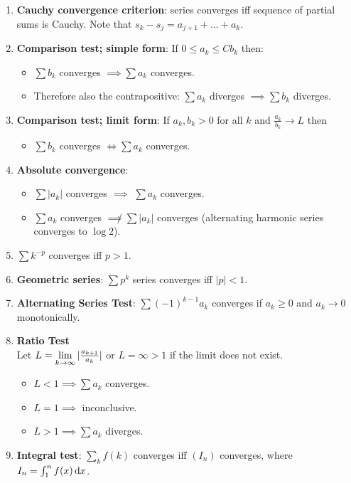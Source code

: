 \begin{theorem*}
\begin{enumerate}[label=(\roman*)]
  \item {\bf Cauchy convergence criterion}: series converges iff sequence of partial sums is
    Cauchy. Note that $s_k - s_j = a_{j+1} + \ldots + a_k$.
  \item {\bf Comparison test; simple form}: If $0 \leq a_k \leq Cb_k$ then:
    \begin{itemize}
    \item $\sum b_k$ converges $\implies \sum a_k$ converges.
    \item Therefore also the contrapositive: $\sum a_k$ diverges $\implies \sum b_k$ diverges.
    \end{itemize}
  \item {\bf Comparison test; limit form}: If $a_k, b_k > 0$ for all $k$ and
    $\frac{a_k}{b_k} \to L$ then
    \begin{itemize}
    \item $\sum b_k$ converges $\iff \sum a_k$ converges.
    \end{itemize}
  \item {\bf Absolute convergence}:
    \begin{itemize}
    \item $\sum |a_k|$ converges $\implies$ $\sum a_k$ converges.
    \item $\sum a_k$ converges $\not \implies \sum |a_k|$ converges (alternating harmonic series
      converges to $\log 2$).
    \end{itemize}
  \item $\sum k^{-p}$ converges iff $p > 1$.
  \item {\bf Geometric series}: $\sum p^k$ series converges iff $|p| < 1$.
  \item {\bf Alternating Series Test}: $\sum (-1)^{k-1}a_k$ converges if $a_k \geq 0$ and $a_k \to 0$
    monotonically.
  \item {\bf Ratio Test}\\
    Let $L = \limk |\frac{a_{k+1}}{a_k}|$ or $L = \infty > 1$ if the limit does not exist.
    \begin{itemize}
    \item $L < 1 \implies \sum a_k$ converges.
    \item $L = 1 \implies$ inconclusive.
    \item $L > 1 \implies \sum a_k$ diverges.
    \end{itemize}
  \item {\bf Integral test}: $\sum_k f(k)$ converges iff $(I_n)$ converges, where
    $I_n = \int_1^n f(x) \dx$.
  \end{enumerate}
\end{theorem*}



